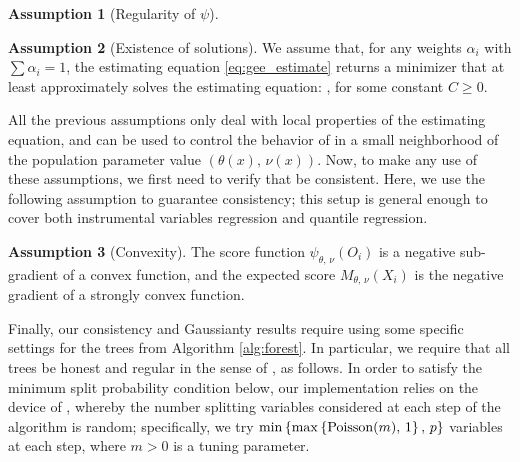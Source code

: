 \documentclass[aos]{imsart}
\theoremstyle{plain}
\theoremstyle{definition}
\newtheorem{assu}{Assumption}
\theoremstyle{remark}
\begin{document}
\begin{CJK}{UTF8}{gbsn}
{\begin{assu}[Regularity of $\psi$]
\label{assu:donsker}
\end{assu}

\begin{assu}[Existence of solutions]
\label{assu:existence}
We assume that, for any weights $\alpha_i$ with $\sum \alpha_i = 1$,
the estimating equation \eqref{eq:gee_estimate} returns a
minimizer \smash{$(\htheta, \, \hnu)$} that at least approximately
solves the estimating equation:
,
for some constant $C \geq 0$.
\end{assu}

All the previous assumptions only deal with local properties of the estimating
equation, and can be used to control the behavior of 
in a small neighborhood of the population parameter value $(\theta(x), \, \nu(x))$.
Now, to make any use of these assumptions, we first need to verify that 
 be consistent. Here, we use the following assumption
to guarantee consistency; this setup is general enough to cover both instrumental
variables regression and quantile regression.

\begin{assu}[Convexity]
\label{assu:convexity}
The score function $\psi_{\theta, \, \nu}(O_i)$ is a negative sub-gradient of a convex function,
and the expected score $M_{\theta, \, \nu}(X_i)$ is the negative gradient of a strongly convex function.
\end{assu}

Finally, our consistency and Gaussianty results require using some specific settings
for the trees from Algorithm \ref{alg:forest}.
In particular, we require that all trees be honest and regular in the sense of \citet{wager2015estimation}, as follows.
In order to satisfy the minimum split probability condition below,
our implementation relies on the device of \citet{denil2014narrowing}, whereby the number splitting variables
considered at each step of the algorithm is random; specifically, we try
$\min\left\{\max\left\{\text{Poisson$(m)$}, \, 1\right\}, \, p\right\}$ variables at each step,
where $m > 0$ is a tuning parameter.

}
\end{CJK}
\end{document}

